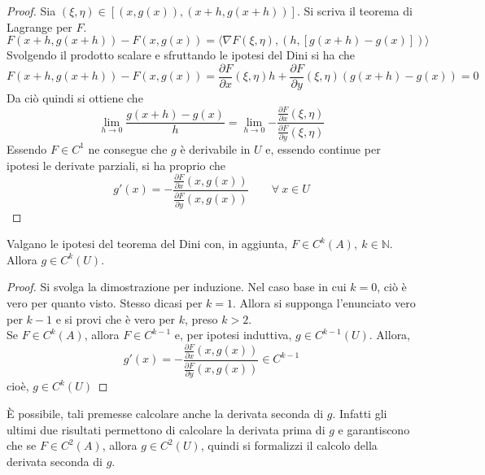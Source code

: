 \begin{proof}
Sia $(\xi, \eta) \in \left[(x, g(x)), (x+h, g(x+h)) \right]$.
Si scriva il teorema di Lagrange per $F$.
\begin{equation}
    F(x+h, g(x+h))-F(x, g(x)) =\langle \nabla F (\xi, \eta), (h, [g(x+h)-g(x)]) \rangle
\end{equation}
Svolgendo il prodotto scalare e sfruttando le ipotesi del Dini si ha che
\begin{equation}
    F(x+h, g(x+h))-F(x, g(x))= \frac{\partial {F}}{\partial{x}}(\xi, \eta) h + \frac{\partial {F}}{\partial{y}}(\xi, \eta) (g(x+h)-g(x))=0
\end{equation}
    Da ciò quindi si ottiene che
    \begin{equation}
        \lim_{h \to 0}{\frac{g(x+h)-g(x)}{h}}=\lim_{h \to 0}{-\frac{\frac{\partial {F}}{\partial{x}}(\xi, \eta)}{\frac{\partial {F}}{\partial{y}}(\xi, \eta)}}
    \end{equation}
Essendo $F \in C^1$ ne consegue che $g$ è derivabile in $U$ e, essendo continue per ipotesi le derivate parziali, si ha proprio che
\begin{equation}
    g'(x)=-\frac{\frac{\partial{F}}{\partial{x}}(x, g(x))}{\frac{\partial{F}}{\partial{y}}(x, g(x))} \qquad \forall\ x \in U
\end{equation}
\end{proof}
\begin{corollary}
    Valgano le ipotesi del teorema del Dini con, in aggiunta, $F \in C^k(A),\ k \in \mathbb{N}$. Allora $g \in C^k(U)$.
\end{corollary}
\begin{proof}
    Si svolga la dimostrazione per induzione.
    Nel caso base in cui $k=0$, ciò è vero per quanto visto. Stesso dicasi per $k=1$. Allora si supponga l'enunciato vero per $k-1$ e si provi che è vero per $k$, preso $k>2$.\\
    Se $F \in C^k(A)$, allora $F \in C^{k-1}$ e, per ipotesi induttiva, $g \in C^{k-1}(U)$. Allora, 
    \begin{equation}
         g'(x)=-\frac{\frac{\partial{F}}{\partial{x}}(x, g(x))}{\frac{\partial{F}}{\partial{y}}(x, g(x))} \in C^{k-1}
    \end{equation}
    cioè, $g \in C^k(U)$
\end{proof}
È possibile, tali premesse calcolare anche la derivata seconda di $g$. Infatti gli ultimi due risultati permettono di calcolare la derivata prima di $g$ e garantiscono che se $F \in C^2(A)$, allora $g \in C^2(U)$, quindi si formalizzi il calcolo della derivata seconda di $g$.
